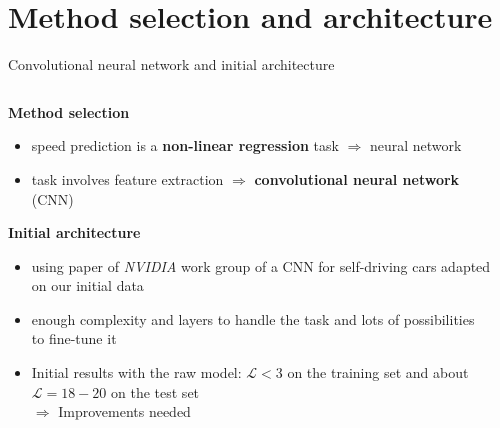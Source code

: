 \section{Method selection and architecture}

\begin{frame}{Convolutional neural network and initial architecture}
	\begin{columns}[c]
		\begin{column}{0.55\textwidth}
			\textbf{Method selection}
			\begin{itemize}
				\item<+-> speed prediction is a \textbf{non-linear regression} task $\Rightarrow$ neural network
				\item<+-> task involves feature extraction $\Rightarrow$ \textbf{convolutional neural network} (CNN)
			\end{itemize}
			\textbf{Initial architecture}
			\begin{itemize}
				\item using paper of \textit{NVIDIA} work group \cite{NVIDIA2016} of a CNN for self-driving cars adapted on our initial data
				\item enough complexity and layers to handle the task and lots of possibilities to fine-tune it
				\item Initial results with the raw model: $\mathcal{L} < 3$ on the training set and about $\mathcal{L} = 18-20$ on the test set\\
				$\Rightarrow$ Improvements needed
			\end{itemize}
		\end{column}
		\begin{column}{0.4\textwidth}

\end{column}
\end{columns}
\end{frame}
